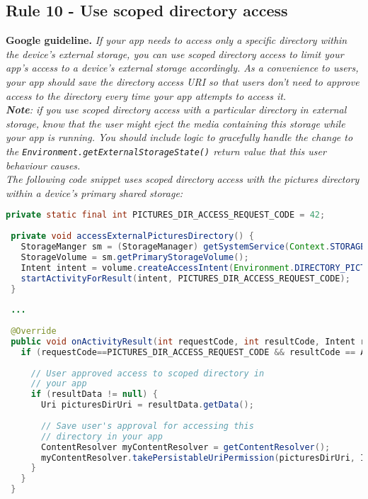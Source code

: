 \subsection{Rule 10 - Use scoped directory access} 
\textbf{Google guideline.} \emph{If your app needs to access only a specific directory within the device's external storage, you can use \textit{scoped directory access} to limit your app's access to a device's external storage accordingly. As a convenience to users, your app should save the directory access URI so that users don't need to approve access to the directory every time your app attempts to access it.
\\
\textbf{Note}: if you use scoped directory access with a particular directory in external storage, know that the user might eject the media containing this storage while your app is running. You should include logic to gracefully handle the change to the \texttt{Environment.getExternalStorageState()} return value that this user behaviour causes.
\\
The following code snippet uses scoped directory access with the pictures directory within a device's primary shared storage:}
\begin{lstlisting}[language=Java, caption=Use scoped directory access, numbers=none]
 private static final int PICTURES_DIR_ACCESS_REQUEST_CODE = 42;
 
 private void accessExternalPicturesDirectory() {
   StorageManger sm = (StorageManager) getSystemService(Context.STORAGE_SERVICE);
   StorageVolume = sm.getPrimaryStorageVolume();
   Intent intent = volume.createAccessIntent(Environment.DIRECTORY_PICTURES);
   startActivityForResult(intent, PICTURES_DIR_ACCESS_REQUEST_CODE);
 }
 
 ...
 
 @Override
 public void onActivityResult(int requestCode, int resultCode, Intent resultData) {
   if (requestCode==PICTURES_DIR_ACCESS_REQUEST_CODE && resultCode == Activity.RESULT_OK) {
   
     // User approved access to scoped directory in
     // your app
     if (resultData != null) {
       Uri picturesDirUri = resultData.getData();
       
       // Save user's approval for accessing this
       // directory in your app
       ContentResolver myContentResolver = getContentResolver();
       myContentResolver.takePersistableUriPermission(picturesDirUri, Intent.FLAG_GRANT_READ_URI_PERMISSION);
     }
   }
 }
\end{lstlisting}

